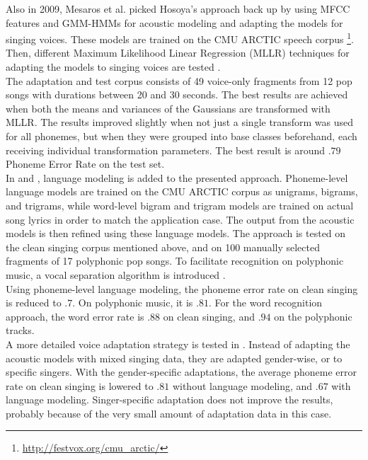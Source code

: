Also in 2009, Mesaros et al. picked Hosoya's approach back up by using MFCC features and GMM-HMMs for acoustic modeling \cite{Mesaros2009} and adapting the models for singing voices. These models are trained on the CMU ARCTIC speech corpus \footnote{\url{http://festvox.org/cmu_arctic/}}. Then, different Maximum Likelihood Linear Regression (MLLR) techniques for adapting the models to singing voices are tested \cite{mllr}.\\
The adaptation and test corpus consists of 49 voice-only fragments from 12 pop songs with durations between 20 and 30 seconds. The best results are achieved when both the means and variances of the Gaussians are transformed with MLLR. The results improved slightly when not just a single transform was used for all phonemes, but when they were grouped into base classes beforehand, each receiving individual transformation parameters. The best result is around $.79$ Phoneme Error Rate on the test set.\\
In \cite{Mesaros2010} and \cite{Mesaros2011}, language modeling is added to the presented approach. Phoneme-level language models are trained on the CMU ARCTIC corpus as unigrams, bigrams, and trigrams, while word-level bigram and trigram models are trained on actual song lyrics in order to match the application case. The output from the acoustic models is then refined using these language models. The approach is tested on the clean singing corpus mentioned above, and on 100 manually selected fragments of 17 polyphonic pop songs. To facilitate recognition on polyphonic music, a vocal separation algorithm is introduced \cite{virtanen_separation}.\\
Using phoneme-level language modeling, the phoneme error rate on clean singing is reduced to $.7$. On polyphonic music, it is $.81$. For the word recognition approach, the word error rate is $.88$ on clean singing, and $.94$ on the polyphonic tracks.\\
A more detailed voice adaptation strategy is tested in \cite{Mesaros2010a}. Instead of adapting the acoustic models with mixed singing data, they are adapted gender-wise, or to specific singers. With the gender-specific adaptations, the average phoneme error rate on clean singing is lowered to $.81$ without language modeling, and $.67$ with language modeling. Singer-specific adaptation does not improve the results, probably because of the very small amount of adaptation data in this case.\\
